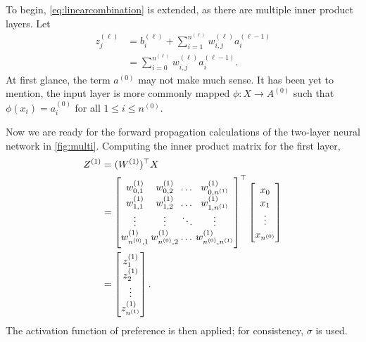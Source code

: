 To begin, \autoref{eq:linearcombination} is extended, as there are multiple inner product layers. Let
\begin{align}
    z^{(\ell)}_j 
    &= b^{(\ell)}_i + \sum_{i=1}^{n^{(\ell)}} w^{(\ell)}_{i,j}a^{(\ell-1)}_i \nonumber \\ 
    &= \sum_{i=0}^{n^{(\ell)}}  w^{(\ell)}_{i,j}a^{(\ell-1)}_i. \label{eq:zee}
\end{align}
At first glance, the term $a^{(0)}$ may not make much sense. It has been yet to mention, the input layer is more commonly mapped $\phi:X\rightarrow A^{(0)}$ such that $\phi(x_i)=a^{(0)}_i$ for all $1 \leq i \leq n^{(0)}$.

Now we are ready for the forward propagation calculations of the two-layer neural network in \autoref{fig:multi}. Computing the inner product matrix for the first layer,
\begin{align*}
    Z^{(1)}   &= (W^{(1)})^\top X \\
        &=
        \arraycolsep=1pt\def\arraystretch{1.1}
        \begin{bmatrix}
            w^{(1)}_{0,1} & w^{(1)}_{0,2} & \dots & w^{(1)}_{0,n^{(1)}} \\
            w^{(1)}_{1,1} & w^{(1)}_{1,2} & \dots & w^{(1)}_{1,n^{(1)}} \\
            \vdots & \vdots & \ddots & \vdots \\
            w^{(1)}_{n^{(0)},1} & w^{(1)}_{n^{(0)},2} & \dots & w^{(1)}_{n^{(0)},n^{(1)}}
        \end{bmatrix}^\top
        \arraycolsep=2pt\def\arraystretch{1.1}
        \begin{bmatrix}
            x_0 \\ x_1 \\ \vdots \\ x_{n^{(0)}}
        \end{bmatrix}
        \\
        &=
        \arraycolsep=2pt\def\arraystretch{1.1}
        \begin{bmatrix}
            z^{(1)}_1 \\ z^{(1)}_2 \\ \vdots \\ z^{(1)}_{n^{(1)}}
        \end{bmatrix}.
\end{align*}
The activation function of preference is then applied; for consistency, $\sigma$ is used.
